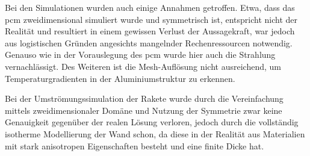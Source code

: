 Bei den Simulationen wurden auch einige Annahmen getroffen. Etwa, dass das \ac{pcm} zweidimensional simuliert wurde und symmetrisch ist, entspricht
nicht der Realität und resultiert in einem gewissen Verlust der Aussagekraft, war jedoch aus logistischen Gründen angesichts mangelnder Rechenressourcen notwendig.
Genauso wie in der Vorauslegung des \ac{pcm} wurde hier auch die Strahlung vernachlässigt. Des Weiteren ist die Mesh-Auflösung nicht ausreichend, um
Temperaturgradienten in der Aluminiumstruktur zu erkennen.

Bei der Umströmungssimulation der Rakete wurde durch die Vereinfachung mittels zweidimensionaler Domäne und Nutzung der Symmetrie zwar keine
Genauigkeit gegenüber der realen Lösung verloren, jedoch durch die vollständig isotherme Modellierung der Wand schon, da diese in der
Realität aus Materialien mit stark anisotropen Eigenschaften besteht und eine finite Dicke hat.